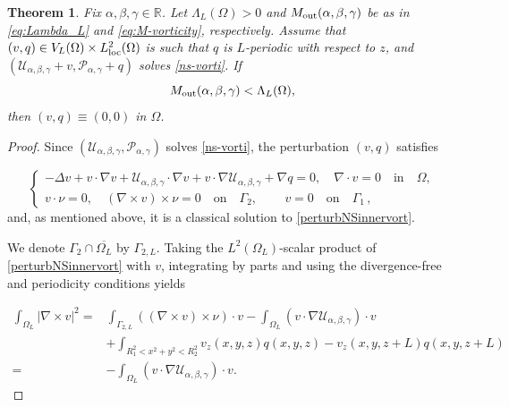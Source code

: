 \documentclass[a4paper,11pt]{amsart}
\newtheorem{theorem}{Theorem}[section]
\numberwithin{equation}{section}
\numberwithin{figure}{section}
\def\U{{\mathcal U}}
\def\P{{\mathcal P}}
\begin{document}
\begin{theorem}\label{theo:unrestuniquevorinner}
	Fix $\alpha,\beta,\gamma\in\mathbb{R}$. Let  $	\Lambda_L(\Omega)>0$ and ${M}_{\rm out}(\alpha,\beta,\gamma)$ be as in \eqref{eq:Lambda_L} and \eqref{eq:M-vorticity}, respectively. 
    Assume that $(v,q)\in V_L(\Omega)\times L^2_{\rm loc}(\Omega)$ is such that $q$ is $L$-periodic with respect to $z$, and $(\U_{\alpha,\beta,\gamma}+v,\P_{\alpha,\gamma}+q)$ solves \eqref{ns-vorti}. If
	\begin{equation}\label{uniqueness-cond-vort-inner}
		{M}_{\rm out}(\alpha,\beta,\gamma)<\Lambda_L(\Omega),
	\end{equation}
	then $(v,q)\equiv (0,0)$ in $\Omega$.
\end{theorem}
\begin{proof}
	Since $(\U_{\alpha,\beta,\gamma},\P_{\alpha,\gamma})$ solves \eqref{ns-vorti}, the perturbation $(v,q)$ satisfies
	
	\begin{equation}\label{perturbNSinnervort}\begin{cases}
			-\Delta v + v \cdot \nabla v + {\U}_{\alpha,\beta,\gamma} \cdot \nabla v  + v \cdot \nabla  {\U}_{\alpha,\beta,\gamma} + \nabla q =0, \quad \nabla\cdot v =0 \quad \text{in} \quad \Omega, \\[5pt]
			v\cdot \nu =0,\quad
			(\nabla\times v)\times \nu=0 \quad
			\text{on}\quad \Gamma_2, \qquad \, v = 0\quad \text{on}\quad \Gamma_1\, ,
		\end{cases}
	\end{equation}and, as mentioned above, it is a classical solution to \eqref{perturbNSinnervort}.
	
	We denote $\Gamma_2\cap \overline{\Omega_L}$ by $\Gamma_{2,L}$.
	Taking the $L^2(\Omega_L)$-scalar product of \eqref{perturbNSinnervort} with $v$, integrating by parts and using the divergence-free and periodicity conditions yields
	
	\begin{equation}\label{dirnorm-vort-periodic}
		\begin{aligned}
			\int_{\Omega_L} |\nabla\times v|^2  =& \int_{\Gamma_{2,L}} ((\nabla\times v)\times \nu)\cdot v- \int_{\Omega_L}\left(v\cdot \nabla {\U}_{\alpha,\beta,\gamma}\right) \cdot v \\
			&+\int_{R_1^2<x^2+y^2<R_2^2} v_z(x,y,z) q(x,y,z)-v_z(x,y,z+L)q(x,y,z+L)\\[5pt]
			=&- \int_{\Omega_L}\left(v\cdot \nabla {\U}_{\alpha,\beta,\gamma}\right) \cdot v.
		\end{aligned}
	\end{equation}
	

\end{proof}
\end{document}
